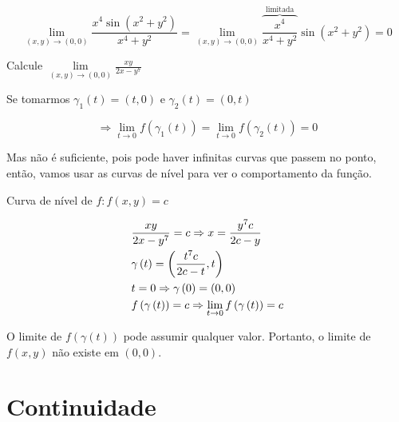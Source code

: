 \documentclass{book}
\begin{document}
\begin{sol}
\[
\mathop {\lim }\limits_{\left( {x,y} \right) \to \left( {0,0} \right)} \frac{{x^4 \sin \left( {x^2  + y^2 } \right)}}
{{x^4  + y^2 }} = \mathop {\lim }\limits_{\left( {x,y} \right) \to \left( {0,0} \right)} \overbrace {\frac{{x^4 }}
{{x^4  + y^2 }}}^{{\text{limitada}}}\sin \left( {x^2  + y^2 } \right) = 0
\]

\end{sol}

\begin{ex}
    Calcule $\mathop {\lim }\limits_{\left( {x,y} \right) \to \left( {0,0} \right)} \frac{{xy}}
{{2x - y^7 }}$
\end{ex}

\begin{sol}
    Se tomarmos $\gamma _1 \left( t \right) = \left( {t,0} \right)$ e $\gamma _2 \left( t \right) = \left( {0,t} \right)$

\[
     \Rightarrow \mathop {\lim }\limits_{t \to 0} f\left( {\gamma _1 \left( t \right)} \right) = \mathop {\lim }\limits_{t \to 0} f\left( {\gamma _2 \left( t \right)} \right) = 0
\]

    Mas n\~ao \'e suficiente, pois pode haver infinitas curvas que passem no ponto, ent\~ao, vamos usar as curvas de n\'ivel para ver o comportamento da fun\c c\~ao.

Curva de n\'ivel de $f: f(x,y)=c$

\[
\begin{gathered}
\frac{{xy}}
{{2x - y^7 }} = c \Rightarrow x = \frac{{y^7 c}}
{{2c - y}} \hfill \\
\gamma \left( t \right) = \left( {\frac{{t^7 c}}
{{2c - t}},t} \right) \hfill \\
t = 0 \Rightarrow \gamma \left( 0 \right) = \left( {0,0} \right) \hfill \\
  f\left( {\gamma \left( t \right)} \right) = c \Rightarrow \mathop {\lim }\limits_{t \to 0} f\left( {\gamma \left( t \right)} \right) = c \hfill \\
\end{gathered}
\]

    O limite de $f\left( {\gamma \left( t \right)} \right)$ pode assumir qualquer valor. Portanto, o limite de $f(x,y)$ n\~ao existe em $(0,0)$.
\end{sol}

\section{Continuidade} \label{sec11}
\end{document}
